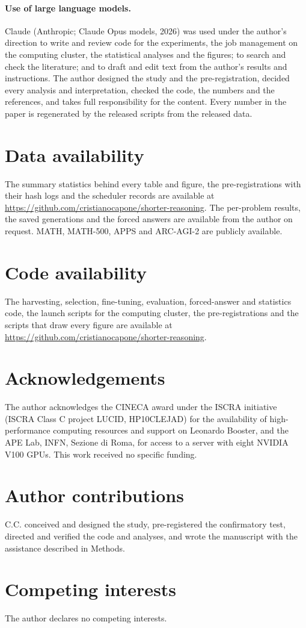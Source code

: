 \documentclass[10pt]{article}
\begin{document}
\paragraph{Use of large language models.} Claude (Anthropic; Claude Opus models, 2026) was used under the author's direction to write and review code for the experiments, the job management on the computing cluster, the statistical analyses and the figures; to search and check the literature; and to draft and edit text from the author's results and instructions. The author designed the study and the pre-registration, decided every analysis and interpretation, checked the code, the numbers and the references, and takes full responsibility for the content. Every number in the paper is regenerated by the released scripts from the released data.

\section*{Data availability}
The summary statistics behind every table and figure, the pre-registrations with their hash logs and the scheduler records are available at \url{https://github.com/cristianocapone/shorter-reasoning}. The per-problem results, the saved generations and the forced answers are available from the author on request. MATH, MATH-500, APPS and ARC-AGI-2 are publicly available.

\section*{Code availability}
The harvesting, selection, fine-tuning, evaluation, forced-answer and statistics code, the launch scripts for the computing cluster, the pre-registrations and the scripts that draw every figure are available at \url{https://github.com/cristianocapone/shorter-reasoning}.

\section*{Acknowledgements}
\begin{sloppypar}
The author acknowledges the CINECA award under the ISCRA initiative (ISCRA Class C project LUCID, HP10CLEJAD) for the availability of high-performance computing resources and support on Leonardo Booster, and the APE Lab, INFN, Sezione di Roma, for access to a server with eight NVIDIA V100 GPUs. This work received no specific funding.
\end{sloppypar}

\section*{Author contributions}
C.C. conceived and designed the study, pre-registered the confirmatory test, directed and verified the code and analyses, and wrote the manuscript with the assistance described in Methods.

\section*{Competing interests}
The author declares no competing interests.


\end{document}
